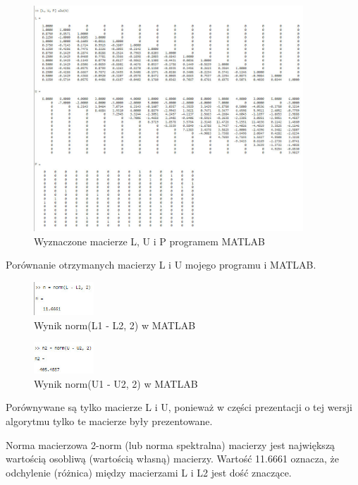 \documentclass[9pt]{article}
\begin{document}
\begin{figure}[h]
  \centering
  \includegraphics[width=0.9\textwidth]{L_U_P_1.jpg}
  \caption{Wyznaczone macierze L, U i P programem MATLAB}
\end{figure}
\newpage

Porównanie otrzymanych macierzy L i U mojego programu i MATLAB.

\begin{figure}[h]
  \centering
  \includegraphics[width=0.2\textwidth]{L1_L2_comparison_1.jpg}
  \caption{Wynik norm(L1 - L2, 2) w MATLAB}
\end{figure}
\newpage

\begin{figure}[h]
  \centering
  \includegraphics[width=0.2\textwidth]{U1_L2_comparison_1.jpg}
  \caption{Wynik norm(U1 - U2, 2) w MATLAB}
\end{figure}

Porównywane są tylko macierze L i U, ponieważ w części prezentacji o tej wersji algorytmu tylko te macierze były prezentowane.

Norma macierzowa 2-norm (lub norma spektralna) macierzy jest największą wartością osobliwą (wartością własną) macierzy. Wartość 11.6661 oznacza, że odchylenie (różnica) między macierzami L i L2 jest dość znaczące.
\end{document}
